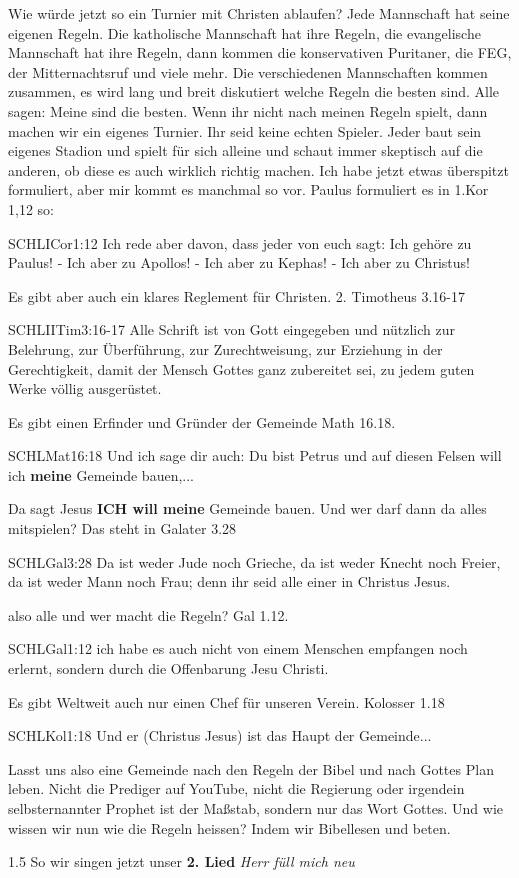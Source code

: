 \documentclass{../inc/mybib}
\begin{document}
\begin{spacing}{1.5}
Wie würde jetzt so ein Turnier mit Christen ablaufen? Jede Mannschaft hat seine eigenen Regeln. Die katholische Mannschaft hat ihre Regeln, die evangelische Mannschaft hat ihre Regeln, dann kommen die konservativen Puritaner, die FEG, der Mitternachtsruf und viele mehr. Die verschiedenen Mannschaften kommen zusammen, es wird lang und breit diskutiert welche Regeln die besten sind. Alle sagen: \glqq Meine sind die besten. Wenn ihr nicht nach meinen Regeln spielt, dann machen wir ein eigenes Turnier. Ihr seid keine echten Spieler.\grqq{} Jeder baut sein eigenes Stadion und spielt für sich alleine und schaut immer skeptisch auf die anderen, ob diese es auch wirklich richtig machen.
Ich habe jetzt etwas überspitzt formuliert, aber mir kommt es manchmal so vor.
Paulus formuliert es in 1.Kor 1,12 so: 
\begin{bibelbox}{SCHL}{ICor}{1:12}
Ich rede aber davon, dass jeder von euch sagt: Ich gehöre zu Paulus! - Ich aber zu Apollos! - Ich aber zu Kephas! - Ich aber zu Christus!
\end{bibelbox}
Es gibt aber auch ein klares Reglement für Christen. 2. Timotheus 3.16-17
\begin{bibelbox}{SCHL}{IITim}{3:16-17}
Alle Schrift ist von Gott eingegeben und nützlich zur Belehrung, zur Überführung, zur Zurechtweisung, zur Erziehung in der Gerechtigkeit, damit der Mensch Gottes ganz zubereitet sei, zu jedem guten Werke völlig ausgerüstet.
\end{bibelbox}
Es gibt einen Erfinder und Gründer der Gemeinde Math 16.18. 
\begin{bibelbox}{SCHL}{Mat}{16:18}
Und ich sage dir auch: Du bist Petrus und auf diesen Felsen will ich \textbf{meine} Gemeinde bauen,...
\end{bibelbox}
Da sagt Jesus \textbf{ICH will meine} Gemeinde bauen.
Und wer darf dann da alles mitspielen? Das steht in  Galater 3.28
\begin{bibelbox}{SCHL}{Gal}{3:28}
Da ist weder Jude noch Grieche, da ist weder Knecht noch Freier, da ist weder Mann noch Frau; denn ihr seid alle einer in Christus Jesus.
\end{bibelbox}
also alle und wer macht die Regeln? Gal 1.12.
\begin{bibelbox}{SCHL}{Gal}{1:12}
ich habe es auch nicht von einem Menschen empfangen noch erlernt, sondern durch die Offenbarung Jesu Christi.
\end{bibelbox}
Es gibt Weltweit auch nur einen Chef für unseren Verein. Kolosser 1.18
\begin{bibelbox}{SCHL}{Kol}{1:18}
Und er (Christus Jesus) ist das Haupt der Gemeinde...
\end{bibelbox}
Lasst uns also eine Gemeinde nach den Regeln der Bibel und nach Gottes Plan leben. 
Nicht die Prediger auf YouTube, nicht die Regierung oder irgendein selbsternannter Prophet ist der Maßstab, sondern nur das Wort Gottes. Und wie wissen wir nun wie die Regeln heissen? Indem wir Bibellesen und beten. 
\end{spacing}{1.5}
So wir singen jetzt unser \textbf{2. Lied} \textit{Herr füll mich neu}
\end{document}

